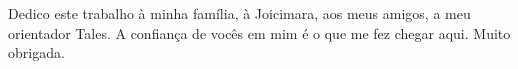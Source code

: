 %
%

\begin{dedicatoria}

Dedico este trabalho à minha família, à Joicimara, aos meus amigos, a meu orientador Tales. A confiança de vocês em mim é o que me fez chegar aqui. Muito obrigada. 

\end{dedicatoria}
